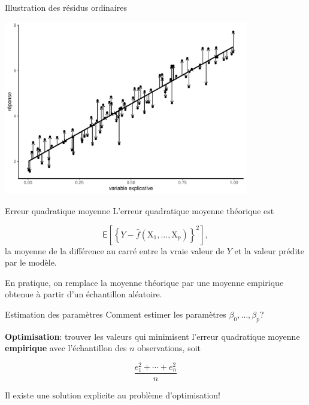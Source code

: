 \documentclass[
  ignorenonframetext,
]{beamer}
\begin{document}
\begin{frame}{Illustration des résidus ordinaires}
\label{illustration-des-ruxe9sidus-ordinaires}
\begin{center}
\includegraphics[width=0.8\textwidth,height=\textheight]{MATH60602-diapos3_files/figure-beamer/distancevert-1.pdf}
\end{center}
\end{frame}

\begin{frame}{Erreur quadratique moyenne}
\label{erreur-quadratique-moyenne}
L'erreur quadratique moyenne théorique est

\[\mathsf{E} \left[\left\{Y - \widehat{f}(\mathrm{X}_1, \ldots, \mathrm{X}_p)\right\}^2\right],\]
la moyenne de la différence au carré entre la vraie valeur de \(Y\) et
la valeur prédite par le modèle.

En pratique, on remplace la moyenne théorique par une moyenne empirique
obtenue à partir d'un échantillon aléatoire.
\end{frame}

\begin{frame}{Estimation des paramètres}
\label{estimation-des-paramuxe8tres}
Comment estimer les paramètres \(\beta_0, \ldots, \beta_p\)?

\textbf{Optimisation}: trouver les valeurs qui minimisent l'erreur
quadratique moyenne \textbf{empirique} avec l'échantillon des \(n\)
observations, soit

\[\frac{e_1^2 + \cdots + e_n^2}{n}\]

Il existe une solution explicite au problème d'optimisation!
\end{frame}
\end{document}
